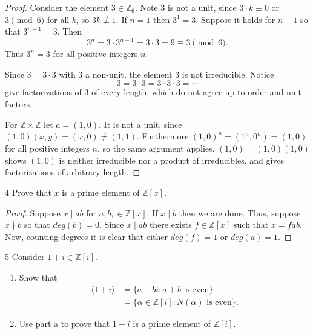 \begin{proof}
    Consider the element $3 \in \mathbb{Z}_6$.
    Note $3$ is not a unit, since $3 \cdot k \equiv 0$ or $3 \pmod 6$
        for all $k$, so $3k \not\equiv 1$.
    If $n = 1$ then $3^1 = 3$.
    Suppose it holds for $n - 1$ so that $3^{n - 1} = 3$. Then
    \[3^n = 3 \cdot 3^{n - 1} = 3 \cdot 3 = 9 \equiv 3 \pmod 6.\]
    Thus $3^n = 3$ for all positive integers $n$.

    Since $3 = 3 \cdot 3$ with $3$ a non-unit, the element $3$
        is not irreducible.
    Notice
    \[3 = 3 \cdot 3 = 3 \cdot 3 \cdot 3 = \cdots\]
    give factorizations of $3$ of every length, which do not agree
        up to order and unit factors.

    For $\mathbb{Z} \times \mathbb{Z}$ let $a = (1, 0)$.
    It is not a unit, since $(1,0)(x,y) = (x, 0) \ne (1,1)$.
    Furthermore $(1,0)^n = (1^n, 0^n) = (1, 0)$ for all positive integers $n$,
        so the same argument applies. $(1,0) = (1,0)(1,0)$ shows
        $(1,0)$ is neither irreducible nor a product of irreducibles,
        and gives factorizations of arbitrary length.
\end{proof}

\newpage

\begin{problem}{4}
    Prove that $x$ is a prime element of $\mathbb{Z}[x]$.
\end{problem}
\solved

\begin{proof}
    Suppose $x \mid ab$ for $a, b, \in \mathbb{Z}[x]$.
    If $x \mid b$ then we are done.
    Thus, suppose $x \nmid b$ so that $deg(b) = 0$.
    Since $x \mid ab$ there exists $f \in \mathbb{Z}[x]$
        such that $x = fab$.
    Now, counting degrees it is clear that either $deg(f) = 1$ or $deg(a) = 1$.
\end{proof}

\begin{problem}{5}
    Consider $1 + i \in \mathbb{Z}[i]$.
    \begin{enumerate}
        \item[(a)] Show that
        \begin{align*}
            \langle 1 + i \rangle &= \{a + bi : a + b \text{ is even}\} \\
            &= \{\alpha \in \mathbb{Z}[i] : N(\alpha) \text{ is even}\}.
        \end{align*}
        \item[(b)] Use part a to prove that $1 + i$ is a prime element of $\mathbb{Z}[i]$.
    \end{enumerate}
\end{problem}
\unsolved

